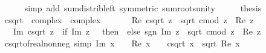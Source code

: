 \begin{isabellebody}
\ \ \ \ \isamarkupfalse%
\ {\isacharparenleft}{\kern0pt}simp\ add{\isacharcolon}{\kern0pt}\ sum{\isacharunderscore}{\kern0pt}distrib{\isacharunderscore}{\kern0pt}left\ {\isacharbrackleft}{\kern0pt}symmetric{\isacharbrackright}{\kern0pt}\ sum{\isacharunderscore}{\kern0pt}roots{\isacharunderscore}{\kern0pt}unity{\isacharparenright}{\kern0pt}\isanewline
\ \ \isamarkupfalse%
\ \isamarkupfalse%
\ {\isacharquery}{\kern0pt}thesis\ \isacommand{{\isachardot}{\kern0pt}}\isamarkupfalse%
\isanewline
{}\isamarkupfalse%
%
\endisatagproof
{\isafoldproof}%
%
\isadelimproof
%
\endisadelimproof
%
\isadelimdocument
%
\endisadelimdocument
%
\isatagdocument
%
\isamarkuptrue%
%
\endisatagdocument
{\isafolddocument}%
%
\isadelimdocument
%
\endisadelimdocument
{}\isamarkupfalse%
\ csqrt\ {\isacharcolon}{\kern0pt}{\isacharcolon}{\kern0pt}\ {\isachardoublequoteopen}complex\ {\isasymRightarrow}\ complex{\isachardoublequoteclose}\isanewline
\ \ \isanewline
\ \ \ \ {\isachardoublequoteopen}Re\ {\isacharparenleft}{\kern0pt}csqrt\ z{\isacharparenright}{\kern0pt}\ {\isacharequal}{\kern0pt}\ sqrt\ {\isacharparenleft}{\kern0pt}{\isacharparenleft}{\kern0pt}cmod\ z\ {\isacharplus}{\kern0pt}\ Re\ z{\isacharparenright}{\kern0pt}\ {\isacharslash}{\kern0pt}\ {}{\isacharparenright}{\kern0pt}{\isachardoublequoteclose}\isanewline
\ \ {\isacharbar}{\kern0pt}\ {\isachardoublequoteopen}Im\ {\isacharparenleft}{\kern0pt}csqrt\ z{\isacharparenright}{\kern0pt}\ {\isacharequal}{\kern0pt}\ {\isacharparenleft}{\kern0pt}if\ Im\ z\ {\isacharequal}{\kern0pt}\ {}\ then\ {}\ else\ sgn\ {\isacharparenleft}{\kern0pt}Im\ z{\isacharparenright}{\kern0pt}{\isacharparenright}{\kern0pt}\ {\isacharasterisk}{\kern0pt}\ sqrt\ {\isacharparenleft}{\kern0pt}{\isacharparenleft}{\kern0pt}cmod\ z\ {\isacharminus}{\kern0pt}\ Re\ z{\isacharparenright}{\kern0pt}\ {\isacharslash}{\kern0pt}\ {}{\isacharparenright}{\kern0pt}{\isachardoublequoteclose}\isanewline
\isanewline
{}\isamarkupfalse%
\ csqrt{\isacharunderscore}{\kern0pt}of{\isacharunderscore}{\kern0pt}real{\isacharunderscore}{\kern0pt}nonneg\ {\isacharbrackleft}{\kern0pt}simp{\isacharbrackright}{\kern0pt}{\isacharcolon}{\kern0pt}\ {\isachardoublequoteopen}Im\ x\ {\isacharequal}{\kern0pt}\ {}\ {\isasymLongrightarrow}\ Re\ x\ {\isasymge}\ {}\ {\isasymLongrightarrow}\ csqrt\ x\ {\isacharequal}{\kern0pt}\ sqrt\ {\isacharparenleft}{\kern0pt}Re\ x{\isacharparenright}{\kern0pt}{\isachardoublequoteclose}\isanewline

\end{isabellebody}
